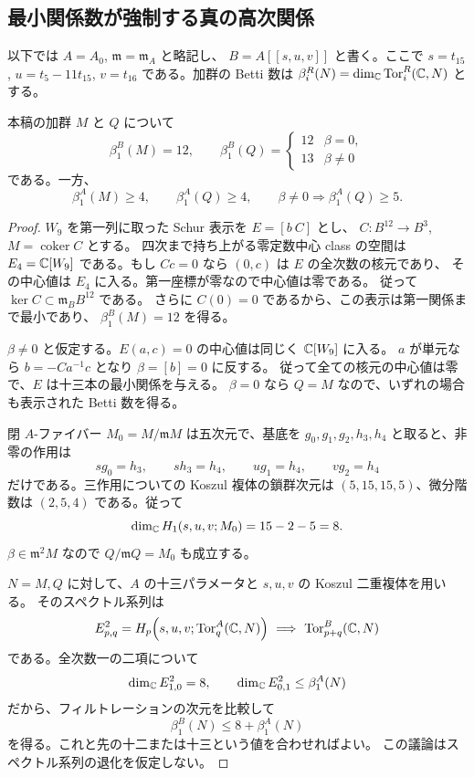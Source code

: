 \subsection{最小関係数が強制する真の高次関係}

以下では $A=A_0$, $\mathfrak m=\mathfrak m_A$ と略記し、
$B=A[[s,u,v]]$ と書く。ここで $s=t_{15}$, $u=t_5-11t_{15}$,
$v=t_{16}$ である。加群の Betti 数は
$\beta_i^R(N)=\dim_\mathbb C\operatorname{Tor}_i^R(\mathbb C,N)$ とする。

\begin{lemma}[二つの基底についての最小関係数]\label{lem:v24-betti-comparison}
本稿の加群 $M$ と $Q$ について
\[
 \beta_1^B(M)=12,\qquad
 \beta_1^B(Q)=
 \begin{cases}12&\beta=0,\\13&\beta\ne0\end{cases}
\]
である。一方、
\[
 \beta_1^A(M)\ge4,\qquad
 \beta_1^A(Q)\ge4,
 \qquad \beta\ne0\Longrightarrow\beta_1^A(Q)\ge5.
\]
\end{lemma}

\begin{proof}
$W_9$ を第一列に取った Schur 表示を $E=[b\ C]$ とし、
$C:B^{12}\to B^3$, $M=\operatorname{coker}C$ とする。
四次まで持ち上がる零定数中心 class の空間は
$E_4=\mathbb C[W_9]$ である。もし $Cc=0$ なら $(0,c)$ は $E$ の全次数の核元であり、
その中心値は $E_4$ に入る。第一座標が零なので中心値は零である。
従って $\ker C\subset\mathfrak m_BB^{12}$ である。
さらに $C(0)=0$ であるから、この表示は第一関係まで最小であり、
$\beta_1^B(M)=12$ を得る。

$\beta\ne0$ と仮定する。$E(a,c)=0$ の中心値は同じく $\mathbb C[W_9]$ に入る。
$a$ が単元なら $b=-Ca^{-1}c$ となり $\beta=[b]=0$ に反する。
従って全ての核元の中心値は零で、$E$ は十三本の最小関係を与える。
$\beta=0$ なら $Q=M$ なので、いずれの場合も表示された Betti 数を得る。

閉 $A$-ファイバー $M_0=M/\mathfrak mM$ は五次元で、基底を
$g_0,g_1,g_2,h_3,h_4$ と取ると、非零の作用は
\[
 sg_0=h_3,\qquad sh_3=h_4,\qquad ug_1=h_4,\qquad vg_2=h_4
\]
だけである。三作用についての Koszul 複体の鎖群次元は
$(5,15,15,5)$、微分階数は $(2,5,4)$ である。従って
\[
 \dim_\mathbb C H_1(s,u,v;M_0)=15-2-5=8.
\]
$\beta\in\mathfrak m^2M$ なので $Q/\mathfrak mQ=M_0$ も成立する。

$N=M,Q$ に対して、$A$ の十三パラメータと $s,u,v$ の Koszul 二重複体を用いる。
そのスペクトル系列は
\[
 E^2_{p,q}=H_p\!\left(s,u,v;
       \operatorname{Tor}_q^A(\mathbb C,N)\right)
 \ \Longrightarrow\ \operatorname{Tor}_{p+q}^B(\mathbb C,N)
\]
である。全次数一の二項について
\[
 \dim_\mathbb C E^2_{1,0}=8,\qquad
 \dim_\mathbb C E^2_{0,1}\le\beta_1^A(N)
\]
だから、フィルトレーションの次元を比較して
\[
 \beta_1^B(N)\le8+\beta_1^A(N)
\]
を得る。これと先の十二または十三という値を合わせればよい。
この議論はスペクトル系列の退化を仮定しない。
\end{proof}

